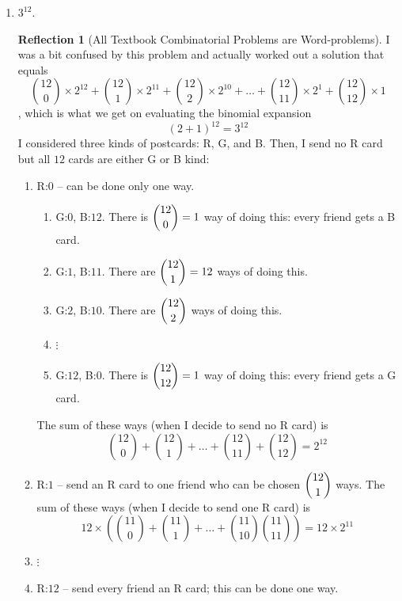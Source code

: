 \documentclass[11pt]{book}
\theoremstyle{definition}
\theoremstyle{plain}
\theoremstyle{definition}
\theoremstyle{problemstyle}
\theoremstyle{remark}
\theoremstyle{definition}
\newtheorem{reflection}{Reflection}
\begin{document}
    \begin{enumerate}[label=(\alph*)]
        \item $3^{12}$. 
            \begin{reflection}[All Textbook Combinatorial Problems are Word-problems]
                I was a bit confused by this problem and actually worked out a solution that equals 
                \[
                    \binom{12}{0}\times2^{12}+\binom{12}{1}\times2^{11}+\binom{12}{2}\times2^{10}+\dots+\binom{12}{11}\times2^1+\binom{12}{12}\times1
                \]
                , which is what we get on evaluating the binomial expansion
                \[
                    (2+1)^{12}=3^{12}
                \]
                I considered three kinds of postcards: R, G, and B. Then, I send no R card but all $12$ cards are either G or B kind:
                \begin{enumerate}[label=\alph*)]
                    \item R:$0$ -- can be done only one way.
                        \begin{enumerate}[label=\arabic*)]
                            \item G:$0$, B:$12$. There is $\dbinom{12}{0}=1$ way of doing this: every friend gets a B card.
                            \item G:$1$, B:$11$. There are $\dbinom{12}{1}=12$ ways of doing this.
                            \item G:$2$, B:$10$. There are $\dbinom{12}{2}$ ways of doing this.
                            \item[]{$\vdots$}
                            \item[$12$)] G:$12$, B:$0$. There is $\dbinom{12}{12}=1$ way of doing this: every friend gets a G card.
                        \end{enumerate}
                        The sum of these ways (when I decide to send no R card) is
                        \[
                            \binom{12}{0}+\binom{12}{1}+\dots+\binom{12}{11}+\binom{12}{12}=2^{12}
                        \]
                    \item R:$1$ -- send an R card to one friend who can be chosen $\dbinom{12}{1}$ ways.
                        The sum of these ways (when I decide to send one R card) is
                        \[
                            12\times(\binom{11}{0}+\binom{11}{1}+\dots+\binom{11}{10}\binom{11}{11})=12\times2^{11}
                        \]
                    \item[]{$\vdots$}
                    \item[l)] R:$12$ -- send every friend an R card; this can be done one way.
                \end{enumerate}


\end{reflection}
\end{enumerate}
\end{document}
